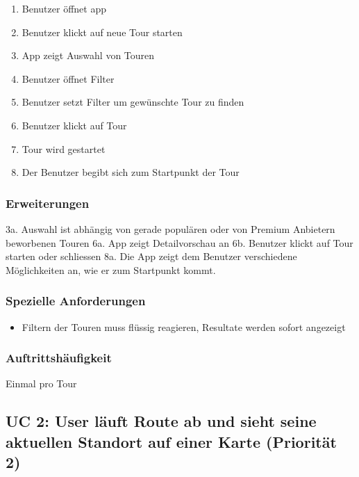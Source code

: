 \documentclass[ngerman,]{article}
\providecommand{\tightlist}{%
  \setlength{\itemsep}{0pt}\setlength{\parskip}{0pt}}
\begin{document}
\begin{enumerate}
\def\labelenumi{\arabic{enumi}.}
\tightlist
\item
  Benutzer öffnet app
\item
  Benutzer klickt auf neue Tour starten
\item
  App zeigt Auswahl von Touren
\item
  Benutzer öffnet Filter
\item
  Benutzer setzt Filter um gewünschte Tour zu finden
\item
  Benutzer klickt auf Tour
\item
  Tour wird gestartet
\item
  Der Benutzer begibt sich zum Startpunkt der Tour
\end{enumerate}

\subsubsection{Erweiterungen}\label{erweiterungen}

3a. Auswahl ist abhängig von gerade populären oder von Premium Anbietern
beworbenen Touren\newline
6a. App zeigt Detailvorschau an\newline
6b. Benutzer klickt auf Tour starten oder schliessen\newline
8a. Die App zeigt dem Benutzer verschiedene Möglichkeiten an, wie er zum
Startpunkt kommt.

\subsubsection{Spezielle Anforderungen}\label{spezielle-anforderungen}

\begin{itemize}
\tightlist
\item
  Filtern der Touren muss flüssig reagieren, Resultate werden sofort
  angezeigt
\end{itemize}

\subsubsection{Auftrittshäufigkeit}\label{auftrittshuxe4ufigkeit}

Einmal pro Tour

\subsection{UC 2: User läuft Route ab und sieht seine aktuellen Standort
auf einer Karte (Priorität
2)}\label{uc-2-user-luxe4uft-route-ab-und-sieht-seine-aktuellen-standort-auf-einer-karte-priorituxe4t-2}
\end{document}
